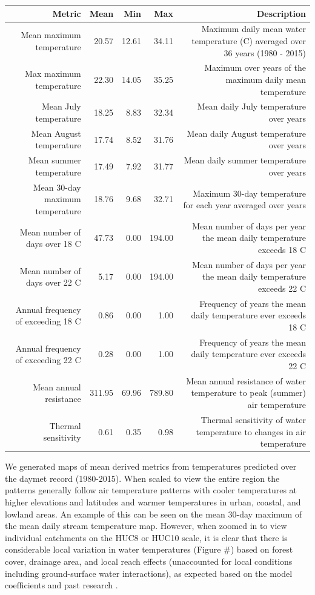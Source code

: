 \documentclass[]{article}
\begin{document}
\begin{longtable}[c]{@{}rrrrr@{}}
\toprule
Metric & Mean & Min & Max & Description\tabularnewline
\midrule
\endhead
Mean maximum temperature & 20.57 & 12.61 & 34.11 & Maximum daily mean
water temperature (C) averaged over 36 years (1980 -
2015)\tabularnewline
Max maximum temperature & 22.30 & 14.05 & 35.25 & Maximum over years of
the maximum daily mean temperature\tabularnewline
Mean July temperature & 18.25 & 8.83 & 32.34 & Mean daily July
temperature over years\tabularnewline
Mean August temperature & 17.74 & 8.52 & 31.76 & Mean daily August
temperature over years\tabularnewline
Mean summer temperature & 17.49 & 7.92 & 31.77 & Mean daily summer
temperature over years\tabularnewline
Mean 30-day maximum temperature & 18.76 & 9.68 & 32.71 & Maximum 30-day
temperature for each year averaged over years\tabularnewline
Mean number of days over 18 C & 47.73 & 0.00 & 194.00 & Mean number of
days per year the mean daily temperature exceeds 18 C\tabularnewline
Mean number of days over 22 C & 5.17 & 0.00 & 194.00 & Mean number of
days per year the mean daily temperature exceeds 22 C\tabularnewline
Annual frequency of exceeding 18 C & 0.86 & 0.00 & 1.00 & Frequency of
years the mean daily temperature ever exceeds 18 C\tabularnewline
Annual frequency of exceeding 22 C & 0.28 & 0.00 & 1.00 & Frequency of
years the mean daily temperature ever exceeds 22 C\tabularnewline
Mean annual resistance & 311.95 & 69.96 & 789.80 & Mean annual
resistance of water temperature to peak (summer) air
temperature\tabularnewline
Thermal sensitivity & 0.61 & 0.35 & 0.98 & Thermal sensitivity of water
temperature to changes in air temperature\tabularnewline
\bottomrule
\end{longtable}

We generated maps of mean derived metrics from temperatures predicted
over the daymet record (1980-2015). When scaled to view the entire
region the patterns generally follow air temperature patterns with
cooler temperatures at higher elevations and latitudes and warmer
temperatures in urban, coastal, and lowland areas. An example of this
can be seen on the mean 30-day maximum of the mean daily stream
temperature map. However, when zoomed in to view individual catchments
on the HUC8 or HUC10 scale, it is clear that there is considerable local
variation in water temperatures (Figure \#) based on forest cover,
drainage area, and local reach effects (unaccounted for local conditions
including ground-surface water interactions), as expected based on the
model coefficients and past research \citep{Kanno2013}.
\end{document}
